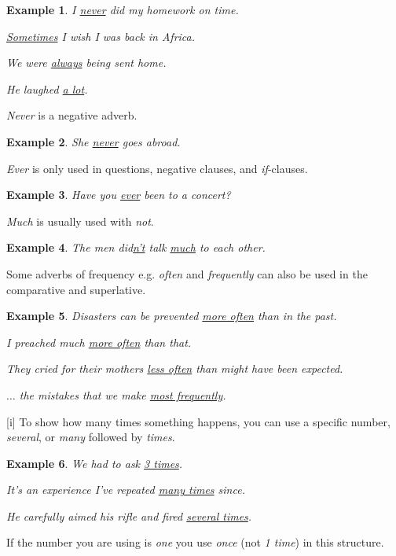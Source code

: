 \documentclass[oneside]{book}
\numberwithin{equation}{section}
\newtheorem{example}{Example}[section]
\begin{document}
\begin{example}
    I \underline{never} did my homework on time.
    
    \underline{Sometimes} I wish I was back in Africa.
    
    We were \underline{always} being sent home.
    
    He laughed \underline{a lot}.
\end{example}
\textit{Never} is a negative adverb.
\begin{example}
    She \underline{never} goes abroad.
\end{example}
\textit{Ever} is only used in questions, negative clauses, and \textit{if}-clauses.
\begin{example}
    Have you \underline{ever} been to a concert?
\end{example}
\textit{Much} is usually used with \textit{not}.
\begin{example}
    The men did\underline{n't} talk \underline{much} to each other.
\end{example}
Some adverbs of frequency e.g. \textit{often} and \textit{frequently} can also be used in the comparative and superlative.
\begin{example}
    Disasters can be prevented \underline{more often} than in the past.
    
    I preached much \underline{more often} than that.
    
    They cried for their mothers \underline{less often} than might have been expected.
    
    $\ldots$ the mistakes that we make \underline{most frequently}.
\end{example}
%
\noindent{} [i] To show how many times something happens, you can use a specific number, \textit{several}, or \textit{many} followed by \textit{times}.
\begin{example}
    We had to ask \underline{3 times}.
    
    It's an experience I've repeated \underline{many times} since.
    
    He carefully aimed his rifle and fired \underline{several times}.
\end{example}
If the number you are using is \textit{one} you use \textit{once} (not \textit{1 time}) in this structure.
\end{document}
